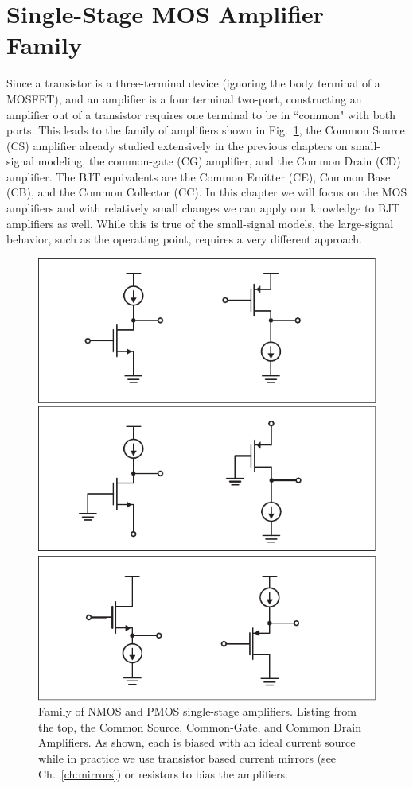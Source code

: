 \section{Single-Stage MOS Amplifier Family}
Since a transistor is a three-terminal device (ignoring the body terminal of a MOSFET), and an amplifier is a four terminal two-port, constructing an amplifier out of a transistor requires one terminal to be in ``common" with both ports.  This leads to the family of amplifiers shown in Fig.~\ref{fig:ampchart}, the Common Source (CS) amplifier already studied extensively in the previous chapters on small-signal modeling, the common-gate (CG) amplifier, and the Common Drain (CD) amplifier.  The BJT equivalents are the Common Emitter (CE), Common Base (CB), and the Common Collector (CC).  In this chapter we will focus on the MOS amplifiers and with relatively small changes we can apply our knowledge to BJT amplifiers as well.  While this is true of the small-signal models, the large-signal behavior, such as the operating point, requires a very different approach.
\begin{figure}[tb]
\centering
\includegraphics[scale=.75]{ampchart}
\caption{Family of NMOS and PMOS single-stage amplifiers.  Listing from the top, the Common Source, Common-Gate, and Common Drain Amplifiers.  As shown, each is biased with an ideal current source while in practice we use transistor based current mirrors (see Ch.~\ref{ch:mirrors}) or resistors to bias the amplifiers.}
\label{fig:ampchart}
\end{figure}
